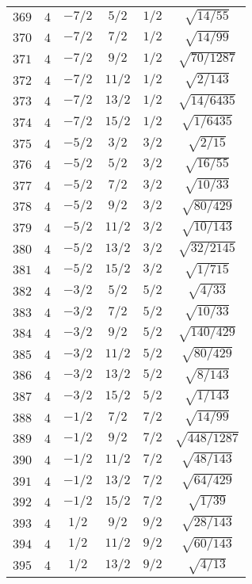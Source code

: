 \begin{table}
\begin{center}
\begin{tabular}{|c|c|c|c|c|c|}
$369$ & $4$ & $-7/2$ & $5/2$ & $1/2$ & $\sqrt{14/55}$ \\ 
$370$ & $4$ & $-7/2$ & $7/2$ & $1/2$ & $\sqrt{14/99}$ \\ 
$371$ & $4$ & $-7/2$ & $9/2$ & $1/2$ & $\sqrt{70/1287}$ \\ 
$372$ & $4$ & $-7/2$ & $11/2$ & $1/2$ & $\sqrt{2/143}$ \\ 
$373$ & $4$ & $-7/2$ & $13/2$ & $1/2$ & $\sqrt{14/6435}$ \\ 
$374$ & $4$ & $-7/2$ & $15/2$ & $1/2$ & $\sqrt{1/6435}$ \\ 
$375$ & $4$ & $-5/2$ & $3/2$ & $3/2$ & $\sqrt{2/15}$ \\ 
$376$ & $4$ & $-5/2$ & $5/2$ & $3/2$ & $\sqrt{16/55}$ \\ 
$377$ & $4$ & $-5/2$ & $7/2$ & $3/2$ & $\sqrt{10/33}$ \\ 
$378$ & $4$ & $-5/2$ & $9/2$ & $3/2$ & $\sqrt{80/429}$ \\ 
$379$ & $4$ & $-5/2$ & $11/2$ & $3/2$ & $\sqrt{10/143}$ \\ 
$380$ & $4$ & $-5/2$ & $13/2$ & $3/2$ & $\sqrt{32/2145}$ \\ 
$381$ & $4$ & $-5/2$ & $15/2$ & $3/2$ & $\sqrt{1/715}$ \\ 
$382$ & $4$ & $-3/2$ & $5/2$ & $5/2$ & $\sqrt{4/33}$ \\ 
$383$ & $4$ & $-3/2$ & $7/2$ & $5/2$ & $\sqrt{10/33}$ \\ 
$384$ & $4$ & $-3/2$ & $9/2$ & $5/2$ & $\sqrt{140/429}$ \\ 
$385$ & $4$ & $-3/2$ & $11/2$ & $5/2$ & $\sqrt{80/429}$ \\ 
$386$ & $4$ & $-3/2$ & $13/2$ & $5/2$ & $\sqrt{8/143}$ \\ 
$387$ & $4$ & $-3/2$ & $15/2$ & $5/2$ & $\sqrt{1/143}$ \\ 
$388$ & $4$ & $-1/2$ & $7/2$ & $7/2$ & $\sqrt{14/99}$ \\ 
$389$ & $4$ & $-1/2$ & $9/2$ & $7/2$ & $\sqrt{448/1287}$ \\ 
$390$ & $4$ & $-1/2$ & $11/2$ & $7/2$ & $\sqrt{48/143}$ \\ 
$391$ & $4$ & $-1/2$ & $13/2$ & $7/2$ & $\sqrt{64/429}$ \\ 
$392$ & $4$ & $-1/2$ & $15/2$ & $7/2$ & $\sqrt{1/39}$ \\ 
$393$ & $4$ & $1/2$ & $9/2$ & $9/2$ & $\sqrt{28/143}$ \\ 
$394$ & $4$ & $1/2$ & $11/2$ & $9/2$ & $\sqrt{60/143}$ \\ 
$395$ & $4$ & $1/2$ & $13/2$ & $9/2$ & $\sqrt{4/13}$ \\ 

\end{tabular}
\end{center}
\end{table}
